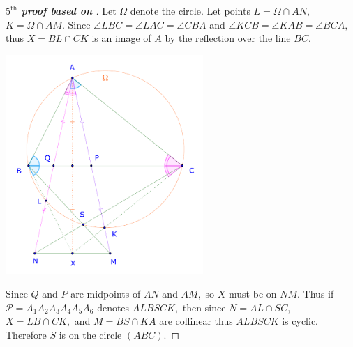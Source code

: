 \documentclass{article}
\begin{document}
\begin{proof}[\textbf{$5^{\text{th}}$ proof based on }]
    Let $\Omega$ denote the circle. Let points $L = \Omega \cap AN,$ $K = \Omega \cap AM.$
    Since $\angle LBC = \angle LAC = \angle CBA$ and $\angle KCB = \angle KAB = \angle BCA,$
    thus $X = BL \cap CK$ is an image of $A$ by the reflection over the line $BC.$

    \begin{center}
        \includegraphics[width=7.5cm]{./svg/pdf/ot-22-23-4-e2-s3.pdf}
    \end{center}

    Since $Q$ and $P$ are midpoints of $AN$ and $AM,$ so $X$ must be on $NM$.
    Thus if $\mathcal{P}=A_1A_2A_3A_4A_5A_6$ denotes $ALBSCK,$
    then since $N = AL \cap SC,$ $X = LB \cap CK,$ and $M = BS \cap KA$ are collinear
    thus $ALBSCK$ is cyclic. Therefore $S$ is on the circle $(ABC).$
\end{proof}

\newpage
\end{document}
